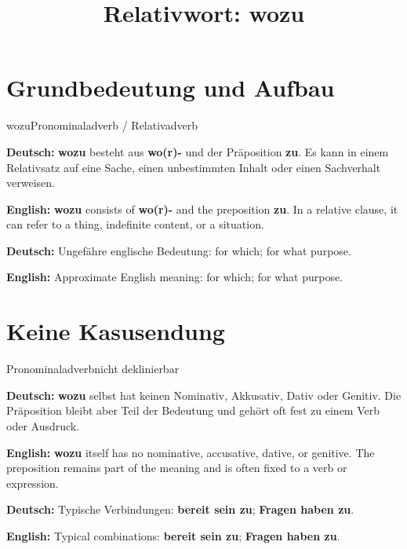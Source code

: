 \documentclass[a4paper,11pt]{article}
\title{Relativwort: \glqq wozu\grqq{}}
\date{}
\newcommand{\GermanText}[1]{\textbf{Deutsch: }#1\par}
\newcommand{\EnglishText}[1]{{\small\color{SoftGray}\textbf{English: }#1\par}}
\begin{document}
\maketitle

\tableofcontents

\newpage

\section{Grundbedeutung und Aufbau}

\begin{grammarentry}{wozu}{Pronominaladverb / Relativadverb}

\GermanText{\textbf{wozu} besteht aus \textbf{wo(r)-} und der Präposition \textbf{zu}. Es kann in einem Relativsatz auf eine Sache, einen unbestimmten Inhalt oder einen Sachverhalt verweisen.}

\EnglishText{\textbf{wozu} consists of \textbf{wo(r)-} and the preposition \textbf{zu}. In a relative clause, it can refer to a thing, indefinite content, or a situation.}

\GermanText{Ungefähre englische Bedeutung: \glqq for which; for what purpose\grqq{}.}

\EnglishText{Approximate English meaning: \glqq for which; for what purpose\grqq{}.}

\end{grammarentry}

\section{Keine Kasusendung}

\begin{grammarentry}{Pronominaladverb}{nicht deklinierbar}

\GermanText{\textbf{wozu} selbst hat keinen Nominativ, Akkusativ, Dativ oder Genitiv. Die Präposition bleibt aber Teil der Bedeutung und gehört oft fest zu einem Verb oder Ausdruck.}

\EnglishText{\textbf{wozu} itself has no nominative, accusative, dative, or genitive. The preposition remains part of the meaning and is often fixed to a verb or expression.}

\GermanText{Typische Verbindungen: \textbf{bereit sein zu}; \textbf{Fragen haben zu}.}

\EnglishText{Typical combinations: \textbf{bereit sein zu}; \textbf{Fragen haben zu}.}

\end{grammarentry}
\end{document}

